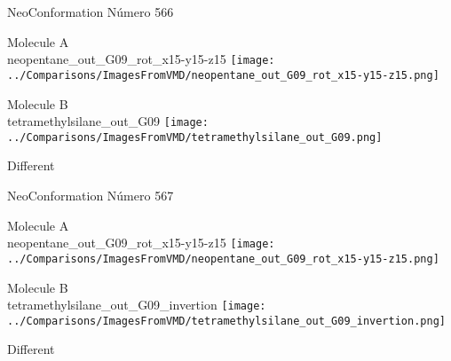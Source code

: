 \vtab[-3cm]
\begin{center}
{\large NeoConformation \tab Número 566}
\end{center}
\begin{multicols}{2}
\begin{center}
Molecule A \\ 
neopentane\_out\_G09\_rot\_x15-y15-z15
\texttt{[image: ../Comparisons/ImagesFromVMD/neopentane\_out\_G09\_rot\_x15-y15-z15.png]}
\\
\vtab

\columnbreak
Molecule B \\ 
tetramethylsilane\_out\_G09
\texttt{[image: ../Comparisons/ImagesFromVMD/tetramethylsilane\_out\_G09.png]}
\\
\vtab


\end{center}
\end{multicols}
\begin{center}
\textcolor{NavyBlue}{\Large Different}
\end{center}

 \newpage

\vtab[-3cm]
\begin{center}
{\large NeoConformation \tab Número 567}
\end{center}
\begin{multicols}{2}
\begin{center}
Molecule A \\ 
neopentane\_out\_G09\_rot\_x15-y15-z15
\texttt{[image: ../Comparisons/ImagesFromVMD/neopentane\_out\_G09\_rot\_x15-y15-z15.png]}
\\
\vtab

\columnbreak
Molecule B \\ 
tetramethylsilane\_out\_G09\_invertion
\texttt{[image: ../Comparisons/ImagesFromVMD/tetramethylsilane\_out\_G09\_invertion.png]}
\\
\vtab


\end{center}
\end{multicols}
\begin{center}
\textcolor{NavyBlue}{\Large Different}
\end{center}

 \newpage

